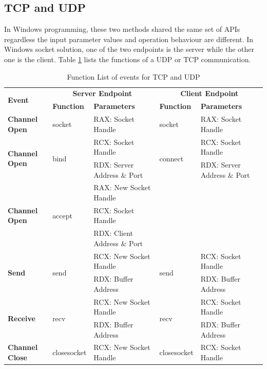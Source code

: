 \subsection{TCP and UDP}
In Windows programming, these two methods shared the same set of APIs regardless the input parameter values and operation behaviour are different. In Windows socket solution, one of the two endpoints is the server while the other one is the client. Table \ref{tcpupdfunctions} lists the functions of a UDP or TCP communication. 
  \begin{table}[H]
        \centering
        \caption{Function List  of events for TCP and UDP}
        \label{tcpupdfunctions}
        \begin{tabular}{|l|l|l|l|l|}
            \hline
             \multirow{2}{*}{\textbf{Event}} &
               \multicolumn{2}{c|}{\textbf{Server Endpoint}} &
               \multicolumn{2}{c|}{\textbf{Client Endpoint}} \\
             \cline{2-5}
              & \textbf{Function}& \textbf{Parameters} & \textbf{Function} & \textbf{Parameters}  \\
             \hline
             \textbf{Channel Open}
             &socket&  RAX: Socket Handle & socket &  RAX: Socket Handle\\
             \hline
                \multirow{2}{*}{{\textbf{Channel Open}}}
              &\multirow{2}{*}{{bind}} &  RCX: Socket Handle & \multirow{2}{*}{connect} &  RCX: Socket Handle\\
              \cline{3-3} \cline{5-5}
             &&  RDX: Server Address $\&$ Port &  &  RDX: Server Address $\&$ Port\\
            \hline
                \multirow{3}{*}{{\textbf{Channel Open}}}
             &\multirow{3}{*}{{accept}} &  RAX: New Socket Handle && \\
              \cline{3-3} 
             &&  RCX:  Socket Handle &  & \\
             \cline{3-3} 
             &&  RDX: Client Address $\&$ Port &  &  \\
            \hline
             \multirow{2}{*}{{\textbf{Send}}}
             &\multirow{2}{*}{send} &  RCX: New Socket Handle & \multirow{2}{*}{send} &  RCX: Socket Handle\\
              \cline{3-3} \cline{5-5}
             &&  RDX: Buffer Address &  &  RDX: Buffer Address\\
           \hline
              \multirow{2}{*}{{\textbf{Receive}}}
             & \multirow{2}{*}{recv}&  RCX: New Socket Handle & \multirow{2}{*}{recv} &  RCX: Socket Handle\\
              \cline{3-3} \cline{5-5}
              &&  RDX: Buffer Address &  &  RDX: Buffer Address\\
            \hline
          {{\textbf{Channel Close}}}&
            {closesocket} & {RCX: New Socket Handle} &{closesocket} & {RCX: Socket Handle}\\
            \hline
        \end{tabular}
    \end{table} 
    

